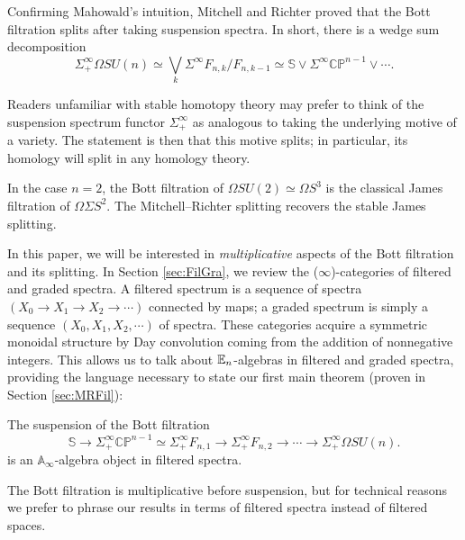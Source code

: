 Confirming Mahowald's intuition, Mitchell and Richter \cite[Theorem 2.1]{CrabbMitchell} proved that the Bott filtration splits after taking suspension spectra.  In short, there is a wedge sum decomposition
$$\Sigma^{\infty}_+ \Omega SU(n) \simeq \bigvee_k \Sigma^{\infty} F_{n,k}/F_{n,k-1} \simeq \mathbb{S} \vee \Sigma^{\infty} \mathbb{CP}^{n-1} \vee \cdots.$$

\begin{rmk}
Readers unfamiliar with stable homotopy theory may prefer to think of the suspension spectrum functor $\Sigma^\infty_+$ as analogous to taking the underlying motive of a variety.  The statement is then that this motive splits; in particular, its homology will split in any homology theory.  
\end{rmk}

\begin{exm}
In the case $n=2$, the Bott filtration of $\Omega SU(2) \simeq \Omega S^3$ is the classical James filtration of $\Omega \Sigma S^2$.  The Mitchell--Richter splitting recovers the stable James splitting.
\end{exm}

In this paper, we will be interested in \emph{multiplicative} aspects of the Bott filtration and its splitting.  In Section \ref{sec:FilGra}, we review the ($\infty$)-categories of filtered and graded spectra.  A filtered spectrum is a sequence of spectra $(X_0 \to X_1 \to X_2 \to \cdots)$ connected by maps; a graded spectrum is simply a sequence $(X_0,X_1,X_2,\cdots)$ of spectra.  These categories acquire a symmetric monoidal structure by Day convolution coming from the addition of nonnegative integers.  This allows us to talk about $\operatorname{\mathbb{E}}_n$-algebras in filtered and graded spectra, providing the language necessary to state our first main theorem (proven in Section \ref{sec:MRFil}):

\begin{thm} \label{thm:BottIsAoo}
The suspension of the Bott filtration 
$$\mathbb{S} \longrightarrow \Sigma_+^{\infty} \mathbb{CP}^{n-1} \simeq \Sigma_+^{\infty} F_{n,1} \longrightarrow \Sigma_+^{\infty} F_{n,2} \longrightarrow \cdots \longrightarrow \Sigma^{\infty}_+ \Omega SU(n).$$
is an $\mathbb{A}_\infty$-algebra object in filtered spectra.
\end{thm}

\begin{rmk}
The Bott filtration is multiplicative before suspension, but for technical reasons we prefer to phrase our results in terms of filtered spectra instead of filtered spaces.
\end{rmk}

